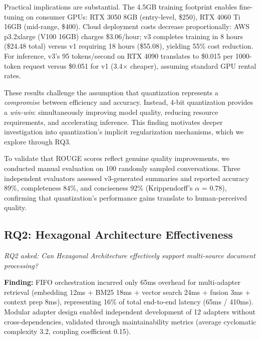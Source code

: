 \documentclass[pdflatex,sn-basic]{sn-jnl}
\begin{document}
Practical implications are substantial. The 4.5GB training footprint enables fine-tuning on consumer GPUs: RTX 3050 8GB (entry-level, \$250), RTX 4060 Ti 16GB (mid-range, \$400). Cloud deployment costs decrease proportionally: AWS p3.2xlarge (V100 16GB) charges \$3.06/hour; v3 completes training in 8 hours (\$24.48 total) versus v1 requiring 18 hours (\$55.08), yielding 55\% cost reduction. For inference, v3's 95 tokens/second on RTX 4090 translates to \$0.015 per 1000-token request versus \$0.051 for v1 (3.4$\times$ cheaper), assuming standard GPU rental rates.

These results challenge the assumption that quantization represents a \textit{compromise} between efficiency and accuracy. Instead, 4-bit quantization provides a \textit{win-win}: simultaneously improving model quality, reducing resource requirements, and accelerating inference. This finding motivates deeper investigation into quantization's implicit regularization mechanisms, which we explore through RQ3.

To validate that ROUGE scores reflect genuine quality improvements, we conducted manual evaluation on 100 randomly sampled conversations. Three independent evaluators assessed v3-generated summaries and reported accuracy 89\%, completeness 84\%, and conciseness 92\% (Krippendorff's $\alpha$ = 0.78), confirming that quantization's performance gains translate to human-perceived quality.

\subsection{RQ2: Hexagonal Architecture Effectiveness}
\label{sec:results-rq2}

\textit{RQ2 asked: Can Hexagonal Architecture effectively support multi-source document processing?}

\textbf{Finding:} FIFO orchestration incurred only 65ms overhead for multi-adapter retrieval (embedding 12ms + BM25 18ms + vector search 24ms + fusion 3ms + context prep 8ms), representing 16\% of total end-to-end latency (65ms / 410ms). Modular adapter design enabled independent development of 12 adapters without cross-dependencies, validated through maintainability metrics (average cyclomatic complexity 3.2, coupling coefficient 0.15).
\end{document}
